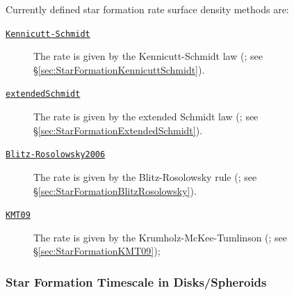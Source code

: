 Currently defined star formation rate surface density methods are:
\begin{description}
 \item [\hyperlink{star_formation.rate_surface_density.disks.Kennicutt-Schmidt.F90:star_formation_rate_surface_density_disks_ks:star_formation_rate_surface_density_disk_ks}{{\tt Kennicutt-Schmidt}}] The rate is given by the Kennicutt-Schmidt law (\citealt{schmidt_rate_1959,kennicutt_global_1998}; see \S\ref{sec:StarFormationKennicuttSchmidt}).
 \item [\hyperlink{star_formation.rate_surface_density.disks.extended_Schmidt.F90:star_formation_rate_surface_density_disks_exschmidt:star_formation_rate_surface_density_disk_exschmidt}{{\tt extendedSchmidt}}] The rate is given by the extended Schmidt law (\citealt{shi_extended_2011}; see \S\ref{sec:StarFormationExtendedSchmidt}).
 \item [\hyperlink{star_formation.rate_surface_density.disks.Blitz-Rosolowsky.F90:star_formation_rate_surface_density_disks_br:star_formation_rate_surface_density_disk_br}{{\tt Blitz-Rosolowsky2006}}] The rate is given by the Blitz-Rosolowsky rule (\citealt{blitz_role_2006}; see \S\ref{sec:StarFormationBlitzRosolowsky}).
 \item [\hyperlink{star_formation.rate_surface_density.disks.KMT09.F90:star_formation_rate_surface_density_disks_kmt09:star_formation_rate_surface_density_disk_kmt09}{{\tt KMT09}}] The rate is given by the Krumholz-McKee-Tumlinson (\citealt{krumholz_star_2009}; see \S\ref{sec:StarFormationKMT09});
\end{description}

\subsubsection{Star Formation Timescale in Disks/Spheroids}

